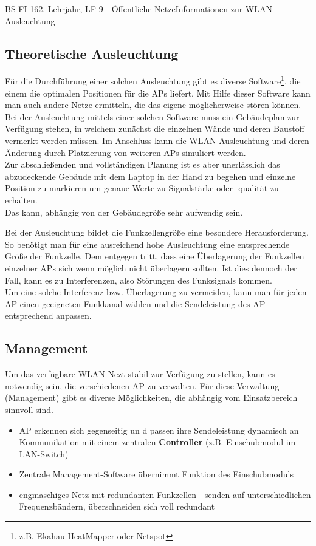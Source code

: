 \documentclass[11pt,twocolumn,oneside,openany,headings=optiontotoc,11pt,numbers=noenddot]{article}
\begin{document}
\begin{worksheet}{BS FI 16}{2. Lehrjahr, LF 9 - Öffentliche Netze}{Informationen zur WLAN-Ausleuchtung}
		\subsection*{Theoretische Ausleuchtung} Für die Durchführung einer solchen Ausleuchtung gibt es diverse Software\footnote{z.B. Ekahau HeatMapper oder Netspot}, die einem die optimalen Positionen für die APs liefert. Mit Hilfe dieser Software kann man auch andere Netze ermitteln, die das eigene möglicherweise stören können.\\
		Bei der Ausleuchtung mittels einer solchen Software muss ein Gebäudeplan zur Verfügung stehen, in welchem zunächst die einzelnen Wände und deren Baustoff vermerkt werden müssen. Im Anschluss kann die WLAN-Ausleuchtung und deren Änderung durch Platzierung von weiteren APs simuliert werden.\\
		Zur abschließenden und vollständigen Planung ist es aber unerlässlich das abzudeckende Gebäude mit dem Laptop in der Hand zu begehen und einzelne Position zu markieren um genaue Werte zu Signalstärke oder -qualität zu erhalten.\\
		Das kann, abhängig von der Gebäudegröße sehr aufwendig sein.\\
		\par\noindent
		Bei der Ausleuchtung bildet die Funkzellengröße eine besondere Herausforderung. So benötigt man für eine ausreichend hohe Ausleuchtung eine entsprechende Größe der Funkzelle. Dem entgegen tritt, dass eine Überlagerung der Funkzellen einzelner APs sich wenn möglich nicht überlagern sollten. Ist dies dennoch der Fall, kann es zu Interferenzen, also Störungen des Funksignals kommen.\\
		Um eine solche Interferenz bzw. Überlagerung zu vermeiden, kann man für jeden AP einen geeigneten Funkkanal wählen und die Sendeleistung des AP entsprechend anpassen.
		\subsection*{Management} Um das verfügbare WLAN-Nezt stabil zur Verfügung zu stellen, kann es notwendig sein, die verschiedenen AP zu verwalten. Für diese Verwaltung (Management) gibt es diverse Möglichkeiten, die abhängig vom Einsatzbereich sinnvoll sind.
		\begin{itemize}
			\item AP erkennen sich gegenseitig un d passen ihre Sendeleistung dynamisch an\\
			Kommunikation mit einem zentralen \textbf{Controller} (z.B. Einschubmodul im LAN-Switch)
			\item Zentrale Management-Software übernimmt Funktion des Einschubmoduls
			\item engmaschiges Netz mit redundanten Funkzellen - senden auf unterschiedlichen Frequenzbändern, überschneiden sich voll redundant
		\end{itemize}

\end{worksheet}
\end{document}
